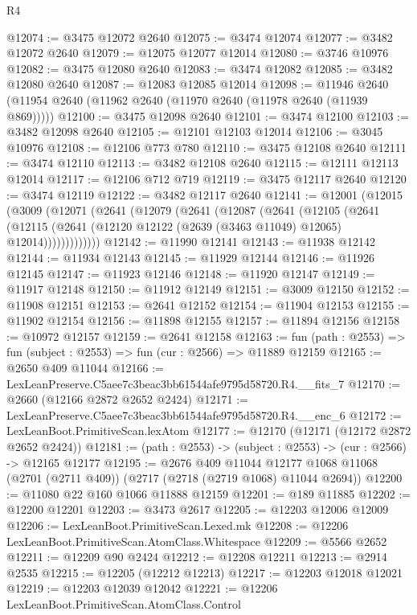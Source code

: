 \begin{lexlean}{R4}
\begin{coremodule}
@12074 := @3475 @12072 @2640
@12075 := @3474 @12074
@12077 := @3482 @12072 @2640
@12079 := @12075 @12077 @12014
@12080 := @3746 @10976
@12082 := @3475 @12080 @2640
@12083 := @3474 @12082
@12085 := @3482 @12080 @2640
@12087 := @12083 @12085 @12014
@12098 := @11946 @2640 (@11954 @2640 (@11962 @2640 (@11970 @2640 (@11978 @2640 (@11939 @869)))))
@12100 := @3475 @12098 @2640
@12101 := @3474 @12100
@12103 := @3482 @12098 @2640
@12105 := @12101 @12103 @12014
@12106 := @3045 @10976
@12108 := @12106 @773 @780
@12110 := @3475 @12108 @2640
@12111 := @3474 @12110
@12113 := @3482 @12108 @2640
@12115 := @12111 @12113 @12014
@12117 := @12106 @712 @719
@12119 := @3475 @12117 @2640
@12120 := @3474 @12119
@12122 := @3482 @12117 @2640
@12141 := @12001
    (@12015
      (@3009
        (@12071
          (@2641
            (@12079
              (@2641
                (@12087
                  (@2641
                    (@12105
                      (@2641
                        (@12115
                          (@2641 (@12120 @12122 (@2639 (@3463 @11049) @12065) @12014)))))))))))))
@12142 := @11990 @12141
@12143 := @11938 @12142
@12144 := @11934 @12143
@12145 := @11929 @12144
@12146 := @11926 @12145
@12147 := @11923 @12146
@12148 := @11920 @12147
@12149 := @11917 @12148
@12150 := @11912 @12149
@12151 := @3009 @12150
@12152 := @11908 @12151
@12153 := @2641 @12152
@12154 := @11904 @12153
@12155 := @11902 @12154
@12156 := @11898 @12155
@12157 := @11894 @12156
@12158 := @10972 @12157
@12159 := @2641 @12158
@12163 := fun (path : @2553) => fun (subject : @2553) => fun (cur : @2566) => @11889 @12159
@12165 := @2650 @409 @11044
@12166 := LexLeanPreserve.C5aee7c3beac3bb61544afe9795d58720.R4.__fits_7
@12170 := @2660 (@12166 @2872 @2652 @2424)
@12171 := LexLeanPreserve.C5aee7c3beac3bb61544afe9795d58720.R4.__enc_6
@12172 := LexLeanBoot.PrimitiveScan.lexAtom
@12177 := @12170 (@12171 (@12172 @2872 @2652 @2424))
@12181 := (path : @2553) -> (subject : @2553) -> (cur : @2566) -> @12165 @12177
@12195 := @2676
    @409
    @11044
    @12177
    @1068
    @11068
    (@2701 (@2711 @409))
    (@2717 (@2718 (@2719 @1068) @11044 @2694))
@12200 := @11080 @22 @160 @1066 @11888 @12159
@12201 := @189 @11885
@12202 := @12200 @12201
@12203 := @3473 @2617
@12205 := @12203 @12006 @12009
@12206 := LexLeanBoot.PrimitiveScan.Lexed.mk
@12208 := @12206 LexLeanBoot.PrimitiveScan.AtomClass.Whitespace
@12209 := @5566 @2652
@12211 := @12209 @90 @2424
@12212 := @12208 @12211
@12213 := @2914 @2535
@12215 := @12205 (@12212 @12213)
@12217 := @12203 @12018 @12021
@12219 := @12203 @12039 @12042
@12221 := @12206 LexLeanBoot.PrimitiveScan.AtomClass.Control

\end{coremodule}
\end{lexlean}
